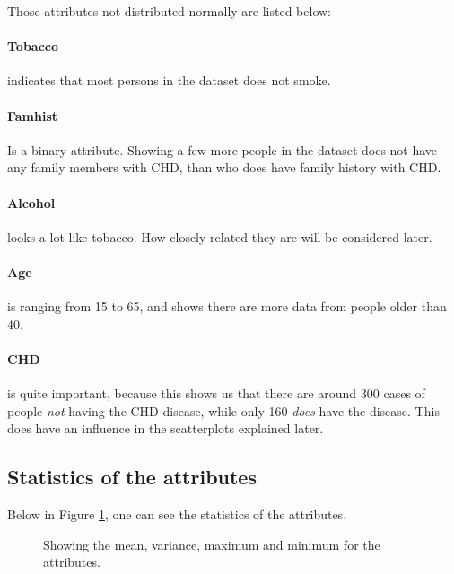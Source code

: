Those attributes not distributed normally are listed below:
\paragraph{Tobacco} indicates that most persons in the dataset does not smoke.
\paragraph{Famhist} Is a binary attribute. Showing a few more people in the dataset does not have any family members with CHD, than who does have family history with CHD.
\paragraph{Alcohol} looks a lot like tobacco. How closely related they are will be considered later.
\paragraph{Age} is ranging from 15 to 65, and shows there are more data from people older than 40.
\paragraph{CHD} is quite important, because this shows us that there are around 300 cases of people \textit{not} having the CHD disease, while only 160 \textit{does} have the disease. This does have an influence in the scatterplots explained later.

\subsection{Statistics of the attributes}

Below in Figure \ref{statistics}, one can see the statistics of the attributes.

\begin{figure}[H]

\caption{Showing the mean, variance, maximum and minimum for the attributes.}
\label{statistics}
\end{figure}